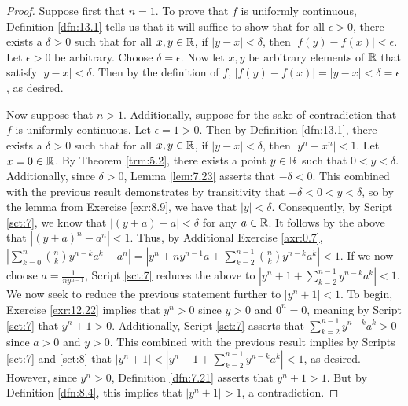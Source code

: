 \documentclass[../main.tex]{subfiles}
\begin{document}
\begin{exercise}
\begin{proof}
        Suppose first that $n=1$. To prove that $f$ is uniformly continuous, Definition \ref{dfn:13.1} tells us that it will suffice to show that for all $\epsilon>0$, there exists a $\delta>0$ such that for all $x,y\in\mathbb{R}$, if $|y-x|<\delta$, then $|f(y)-f(x)|<\epsilon$. Let $\epsilon>0$ be arbitrary. Choose $\delta=\epsilon$. Now let $x,y$ be arbitrary elements of $\mathbb{R}$ that satisfy $|y-x|<\delta$. Then by the definition of $f$, $|f(y)-f(x)|=|y-x|<\delta=\epsilon$, as desired.\par
        Now suppose that $n>1$. Additionally, suppose for the sake of contradiction that $f$ is uniformly continuous. Let $\epsilon=1>0$. Then by Definition \ref{dfn:13.1}, there exists a $\delta>0$ such that for all $x,y\in\mathbb{R}$, if $|y-x|<\delta$, then $|y^n-x^n|<1$. Let $x=0\in\mathbb{R}$. By Theorem \ref{trm:5.2}, there exists a point $y\in\mathbb{R}$ such that $0<y<\delta$. Additionally, since $\delta>0$, Lemma \ref{lem:7.23} asserts that $-\delta<0$. This combined with the previous result demonstrates by transitivity that $-\delta<0<y<\delta$, so by the lemma from Exercise \ref{exr:8.9}, we have that $|y|<\delta$. Consequently, by Script \ref{sct:7}, we know that $|(y+a)-a|<\delta$ for any $a\in\mathbb{R}$. It follows by the above that $|(y+a)^n-a^n|<1$. Thus, by Additional Exercise \ref{axr:0.7}, $|\sum_{k=0}^n\binom{n}{k}y^{n-k}a^k-a^n|=|y^n+ny^{n-1}a+\sum_{k=2}^{n-1}\binom{n}{k}y^{n-k}a^k|<1$. If we now choose $a=\frac{1}{ny^{n-1}}$, Script \ref{sct:7} reduces the above to $|y^n+1+\sum_{k=2}^{n-1}y^{n-k}a^k|<1$. We now seek to reduce the previous statement further to $|y^n+1|<1$. To begin, Exercise \ref{exr:12.22} implies that $y^n>0$ since $y>0$ and $0^n=0$, meaning by Script \ref{sct:7} that $y^n+1>0$. Additionally, Script \ref{sct:7} asserts that $\sum_{k=2}^{n-1}y^{n-k}a^k>0$ since $a>0$ and $y>0$. This combined with the previous result implies by Scripts \ref{sct:7} and \ref{sct:8} that $|y^n+1|<|y^n+1+\sum_{k=2}^{n-1}y^{n-k}a^k|<1$, as desired. However, since $y^n>0$, Definition \ref{dfn:7.21} asserts that $y^n+1>1$. But by Definition \ref{dfn:8.4}, this implies that $|y^n+1|>1$, a contradiction.
    \end{proof}\par\medskip

\end{exercise}
\end{document}
